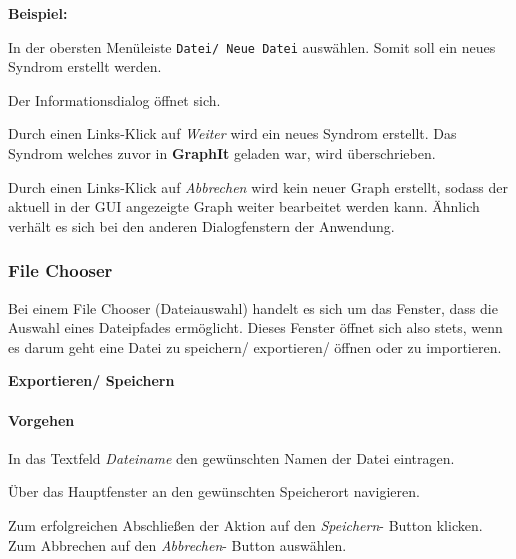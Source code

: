 \documentclass[enabledeprecatedfontcommands,fontsize=11pt,paper=a4,twoside]{scrartcl}
\newcommand*{\action}{\paragraph{Vorgehen}}
\let\origenumerate\enumerate
\let\origendenumerate\endenumerate
\renewenvironment{enumerate}{\origenumerate \addtolength{\itemsep}{-10.0pt}}{\origendenumerate}
\begin{document}
\textbf{Beispiel:}
	\begin{enumerate}
		\item In der obersten Menüleiste \texttt{Datei/ Neue Datei} auswählen. Somit soll ein neues Syndrom erstellt werden.
		\item Der Informationsdialog öffnet sich.
		\item Durch einen Links-Klick auf \textit{Weiter} wird ein neues Syndrom erstellt. Das Syndrom welches zuvor in \textbf{GraphIt} geladen war, wird überschrieben. 
		\item Durch einen Links-Klick auf \textit{Abbrechen} wird kein neuer Graph erstellt, sodass der aktuell in der GUI angezeigte Graph weiter bearbeitet werden kann. 
	\end{enumerate}
Ähnlich verhält es sich bei den anderen Dialogfenstern der Anwendung.\\
	\begin{figure}[ht!]
	\centering
\end{figure}

\newpage
	
\subsubsection{File Chooser} 
Bei einem File Chooser (Dateiauswahl) handelt es sich um das Fenster, dass die Auswahl eines Dateipfades ermöglicht. Dieses Fenster öffnet sich also stets, wenn es darum geht eine Datei zu speichern/ exportieren/ öffnen oder zu importieren. 

\textbf{Exportieren/ Speichern}
\action
\begin{enumerate}
	\item In das Textfeld \textit{Dateiname} den gewünschten Namen der Datei eintragen. 
	\item Über das Hauptfenster an den gewünschten Speicherort navigieren. 
	\item Zum erfolgreichen Abschließen der Aktion auf den \textit{Speichern}- Button klicken. Zum Abbrechen auf den \textit{Abbrechen}- Button auswählen.
\end{enumerate}
\end{document}
